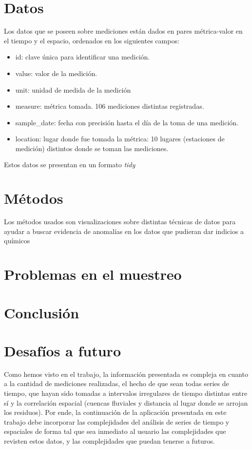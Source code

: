 \documentclass[a4paper, twopager]{article}
\begin{document}
\section{Datos}
Los datos que se poseen sobre mediciones están dados en pares métrica-valor en el tiempo y el espacio, ordenados en los siguientes campos:
\begin{itemize}
\item id: clave única para identificar una medición.
\item value: valor de la medición.
\item unit: unidad de medida de la medición
\item measure: métrica tomada. 106 mediciones distintas registradas.
\item sample\_date: fecha con precisión hasta el día de la toma de una medición.
\item location: lugar donde fue tomada la métrica: 10 lugares (estaciones de medición) distintos donde se toman las mediciones.
\end{itemize}
Estos datos se presentan en un formato \emph{tidy}
\section{Métodos}
Los métodos usados son visualizaciones sobre distintas técnicas de datos para ayudar a buscar evidencia de anomalías en los datos que pudieran dar indicios a químicos 
\section{Problemas en el muestreo}
\section{Conclusión}
\section{Desafíos a futuro}
Como hemos visto en el trabajo, la información presentada es compleja en cuanto a la cantidad de mediciones realizadas, el hecho de que sean todas series de tiempo, que hayan sido tomadas a intervalos irregulares de tiempo distintas entre sí y la correlación espacial (cuencas fluviales y distancia al lugar donde se arrojan los residuos). Por ende, la continuación de la aplicación presentada en este trabajo debe incorporar las complejidades del análisis de series de tiempo y espaciales de forma tal que sea inmediato al usuario las complejidades que revisten estos datos, y las complejidades que puedan tenerse a futuros.
\end{document}

